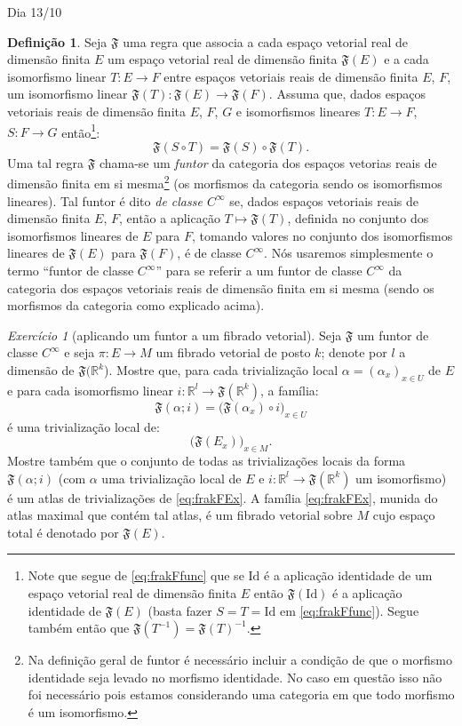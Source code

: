 \documentclass[oneside,11pt]{amsart}
\newcommand{\R}{\mathds R}
\newcommand{\Id}{\mathrm{Id}}
\theoremstyle{remark}\newtheorem{exercise}{Exercício}[section]
\theoremstyle{plain}\newtheorem{teo}{Teorema}[section]
\theoremstyle{plain}\newtheorem{lem}[teo]{Lema}
\theoremstyle{plain}\newtheorem{prop}[teo]{Proposição}
\theoremstyle{definition}\newtheorem{defin}[teo]{Definição}
\theoremstyle{remark}\newtheorem{rem}[teo]{Observação}
\theoremstyle{definition}\newtheorem{example}[teo]{Exemplo}
\numberwithin{equation}{section}
\begin{document}
\begin{section}{Dia 13/10}
\begin{defin}
Seja $\mathfrak F$ uma regra que associa a cada espaço vetorial real de dimensão finita $E$ um espaço vetorial real de dimensão finita $\mathfrak F(E)$
e a cada isomorfismo linear $T:E\to F$ entre espaços vetoriais reais de dimensão finita $E$, $F$, um isomorfismo linear $\mathfrak F(T):\mathfrak F(E)\to\mathfrak F(F)$.
Assuma que, dados espaços vetoriais reais de dimensão finita $E$, $F$, $G$ e isomorfismos lineares $T:E\to F$, $S:F\to G$ então\footnote{%
Note que segue de \eqref{eq:frakFfunc} que se $\Id$ é a aplicação identidade de um espaço vetorial real de dimensão finita $E$ então $\mathfrak F(\Id)$ é
a aplicação identidade de $\mathfrak F(E)$ (basta fazer $S=T=\Id$ em \eqref{eq:frakFfunc}). Segue também então que $\mathfrak F(T^{-1})=\mathfrak F(T)^{-1}$.}:
\begin{equation}\label{eq:frakFfunc}
\mathfrak F(S\circ T)=\mathfrak F(S)\circ\mathfrak F(T).
\end{equation}
Uma tal regra $\mathfrak F$ chama-se um {\em funtor\/} da categoria dos espaços vetorias reais de dimensão finita em si mesma\footnote{%
Na definição geral de funtor é necessário incluir a condição de que o morfismo identidade seja levado no morfismo identidade. No caso em questão
isso não foi necessário pois estamos considerando uma categoria em que todo morfismo é um isomorfismo.}
(os morfismos da categoria
sendo os isomorfismos lineares). Tal funtor é dito {\em de classe $C^\infty$\/} se, dados espaços vetoriais reais de dimensão finita $E$, $F$, então
a aplicação $T\mapsto\mathfrak F(T)$, definida no conjunto dos isomorfismos lineares de $E$ para $F$, tomando valores no conjunto dos isomorfismos lineares
de $\mathfrak F(E)$ para $\mathfrak F(F)$, é de classe $C^\infty$. Nós usaremos simplesmente o termo ``funtor de classe $C^\infty$'' para se referir
a um funtor de classe $C^\infty$ da categoria dos espaços vetoriais reais de dimensão finita em si mesma (sendo os morfismos da categoria como explicado acima).
\end{defin}

\begin{exercise}[aplicando um funtor a um fibrado vetorial]\label{exe:funcvecbund}
Seja $\mathfrak F$ um funtor de classe $C^\infty$ e seja $\pi:E\to M$ um fibrado vetorial de posto $k$; denote por $l$ a dimensão de $\mathfrak F(\R^k$).
Mostre que, para cada trivialização local $\alpha=(\alpha_x)_{x\in U}$ de $E$ e para cada isomorfismo linear $i:\R^l\to\mathfrak F(\R^k)$, a família:
\[\mathfrak F(\alpha;i)=\big(\mathfrak F(\alpha_x)\circ i\big)_{x\in U}\]
é uma trivialização local de:
\begin{equation}\label{eq:frakFEx}
\big(\mathfrak F(E_x)\big)_{x\in M}.
\end{equation}
Mostre também que o conjunto de todas as trivializações locais da forma $\mathfrak F(\alpha;i)$
(com $\alpha$ uma trivialização local de $E$ e $i:\R^l\to\mathfrak F(\R^k)$ um isomorfismo) é um atlas de trivializações de \eqref{eq:frakFEx}.
A família \eqref{eq:frakFEx}, munida do atlas maximal que contém tal atlas, é um fibrado vetorial sobre $M$ cujo espaço total é denotado por
$\mathfrak F(E)$.
\end{exercise}


\end{section}
\end{document}
